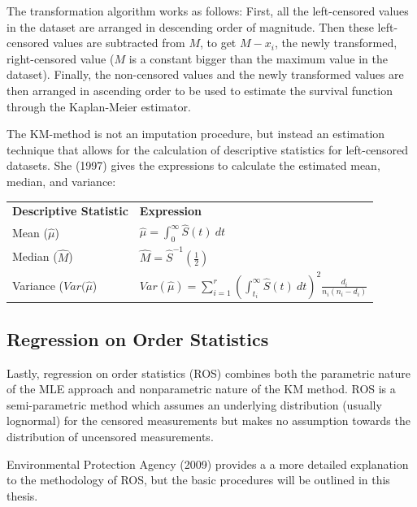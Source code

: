 \documentclass[12pt, twoside]{amherstthesis}
\begin{document}
The transformation algorithm works as follows: First, all the left-censored values in the dataset are arranged in descending order of magnitude. Then these left-censored values are subtracted from \(M\), to get \(M-x_i\), the newly transformed, right-censored value (\(M\) is a constant bigger than the maximum value in the dataset). Finally, the non-censored values and the newly transformed values are then arranged in ascending order to be used to estimate the survival function through the Kaplan-Meier estimator.

The KM-method is not an imputation procedure, but instead an estimation technique that allows for the calculation of descriptive statistics for left-censored datasets. She (1997) gives the expressions to calculate the estimated mean, median, and variance:
\begin{table}[h]
\begin{tabular}{ll}
\textbf{Descriptive Statistic} & \textbf{Expression}                                                                                              \\
Mean ($\hat{\mu}$)             & $\hat{\mu} = \displaystyle \int_{0}^{\infty} \hat{S}(t) \ dt$                                                    \\
Median ($\hat{M}$)             & $\hat{M} = \displaystyle \hat{S}^{-1} \left (\frac{1}{2} \right)$                                                              \\
Variance ($Var(\hat{\mu}$)     & $Var(\hat{\mu}) = \displaystyle \sum_{i=1}^{r} \left( \int_{t_i}^{\infty}\hat{S}(t) \ dt \right)^2 \frac{d_i}{n_i(n_i - d_i)}$
\end{tabular}
\end{table}
\hypertarget{ROS}{%
\subsection{Regression on Order Statistics}\label{ROS}}

Lastly, regression on order statistics (ROS) combines both the parametric nature of the MLE approach and nonparametric nature of the KM method. ROS is a semi-parametric method which assumes an underlying distribution (usually lognormal) for the censored measurements but makes no assumption towards the distribution of uncensored measurements.

Environmental Protection Agency (2009) provides a a more detailed explanation to the methodology of ROS, but the basic procedures will be outlined in this thesis.
\end{document}
